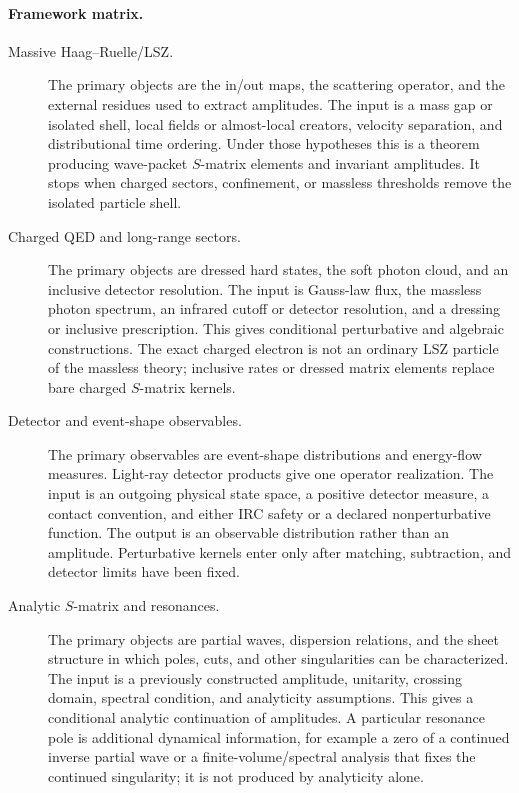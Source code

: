 \paragraph{Framework matrix.}
\begin{description}
  \item[Massive Haag--Ruelle/LSZ.]
  The primary objects are the in/out maps, the scattering operator, and the
  external residues used to extract amplitudes.  The input is a mass gap or
  isolated shell, local fields or almost-local creators, velocity separation,
  and distributional time
  ordering.  Under those hypotheses this is a theorem producing wave-packet
  \(S\)-matrix elements and invariant amplitudes.  It stops when charged
  sectors, confinement, or massless thresholds remove the isolated particle
  shell.
  \item[Charged QED and long-range sectors.]
  The primary objects are dressed hard states, the soft photon cloud, and an
  inclusive detector resolution.  The input is Gauss-law flux, the massless
  photon spectrum, an infrared cutoff or detector resolution, and a dressing
  or inclusive prescription.  This gives conditional perturbative and
  algebraic constructions.  The exact charged electron is not an ordinary LSZ
  particle of the massless theory; inclusive rates or dressed matrix elements
  replace bare charged \(S\)-matrix kernels.
  \item[Detector and event-shape observables.]
  The primary observables are event-shape distributions and energy-flow
  measures.  Light-ray detector products give one operator realization.  The
  input is an outgoing physical state space, a positive detector measure, a
  contact convention, and either IRC safety or a declared nonperturbative
  function.  The output is an observable distribution rather than an amplitude.
  Perturbative kernels enter only after matching, subtraction, and detector
  limits have been fixed.
  \item[Analytic \(S\)-matrix and resonances.]
  The primary objects are partial waves, dispersion relations, and
  the sheet structure in which poles, cuts, and other singularities can be
  characterized.  The input is a previously constructed amplitude, unitarity,
  crossing domain, spectral condition, and analyticity assumptions.  This
  gives a conditional analytic continuation of amplitudes.  A particular
  resonance pole is additional dynamical information, for example a zero of a
  continued inverse partial wave or a finite-volume/spectral analysis that
  fixes the continued singularity; it is not produced by analyticity alone.

\end{description}
